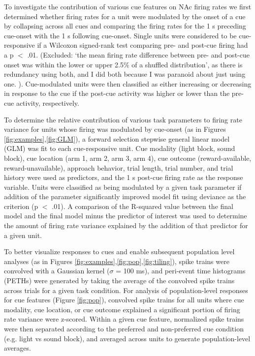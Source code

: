 \documentclass[11pt]{article}
\begin{document}
To investigate the contribution of various cue features on NAc firing rates we first determined whether firing rates for a unit were modulated by the onset of a cue by collapsing across all cues and comparing the firing rates for the 1 s preceding cue-onset with the 1 s following cue-onset. Single units were considered to be cue-responsive if a Wilcoxon signed-rank test comparing pre- and post-cue firing had a p $<$ .01. (Excluded: ‘the mean firing rate difference between pre- and post-cue onset was within the lower or upper 2.5\% of a shuffled distribution’, as there is redundancy using both, and I did both because I was paranoid about just using one. ). Cue-modulated units were then classified as either increasing or decreasing in response to the cue if the post-cue activity was higher or lower than the pre-cue activity, respectively.

To determine the relative contribution of various task parameters to firing rate variance for units whose firing was modulated by cue-onset (as in Figures \ref{fig:examples},\ref{fig:GLM}), a forward selection stepwise general linear model (GLM) was fit to each cue-responsive unit. Cue modality (light block, sound block), cue location (arm 1, arm 2, arm 3, arm 4), cue outcome (reward-available, reward-unavailable), approach behavior, trial length, trial number, and trial history were used as predictors, and the 1 s post-cue firing rate as the response variable. Units were classified as being modulated by a given task parameter if addition of the parameter significantly improved model fit using deviance as the criterion (p $<$ .01). A comparison of the R-squared value between the final model and the final model minus the predictor of interest was used to determine the amount of firing rate variance explained by the addition of that predictor for a given unit.

To better visualize responses to cues and enable subsequent population level analyses (as in Figures \ref{fig:examples},\ref{fig:pop},\ref{fig:tiling}), spike trains were convolved with a Gaussian kernel ($\sigma$ = 100 ms), and peri-event time histograms (PETHs) were generated by taking the average of the convolved spike trains across trials for a given task condition. For analysis of population-level responses for cue features (Figure \ref{fig:pop}), convolved spike trains for all units where cue modality, cue location, or cue outcome explained a significant portion of firing rate variance were z-scored. Within a given cue feature, normalized spike trains were then separated according to the preferred and non-preferred cue condition (e.g. light vs sound block), and averaged across units to generate population-level averages.
\end{document}

